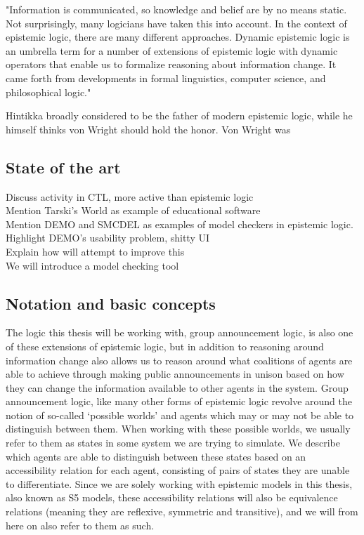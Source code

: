 "Information is communicated, so knowledge and belief are by no means static.
Not surprisingly, many logicians have taken this into account. In the context of
epistemic logic, there are many different approaches. Dynamic epistemic logic
is an umbrella term for a number of extensions of epistemic logic with dynamic
operators that enable us to formalize reasoning about information change. It
came forth from developments in formal linguistics, computer science, and
philosophical logic."\cite{Ditmarsch2007}


Hintikka broadly considered to be the father of modern epistemic logic, while he himself thinks von Wright should hold the honor. Von Wright was 

\subsection{State of the art}


Discuss activity in CTL, more active than epistemic logic\\
Mention Tarski's World as example of educational software\\
Mention DEMO and SMCDEL as examples of model checkers in epistemic logic.\\
Highlight DEMO's usability problem, shitty UI\\
Explain how \cname{} will attempt to improve this\\

We will introduce a model checking tool 

\subsection{Notation and basic concepts}

The logic this thesis will be working with, group announcement logic, is also one of these extensions of epistemic logic, but in addition to reasoning around information change also allows us to reason around what coalitions of agents are able to achieve through making public announcements in unison based on how they can change the information available to other agents in the system. Group announcement logic, like many other forms of epistemic logic revolve around the notion of so-called `possible worlds' and agents which may or may not be able to distinguish between them. When working with these possible worlds, we usually refer to them as states in some system we are trying to simulate. We describe which agents are able to distinguish between these states based on an accessibility relation for each agent, consisting of pairs of states they are unable to differentiate. Since we are solely working with epistemic models in this thesis, also known as S5 models, these accessibility relations will also be equivalence relations (meaning they are reflexive, symmetric and transitive), and we will from here on also refer to them as such.

